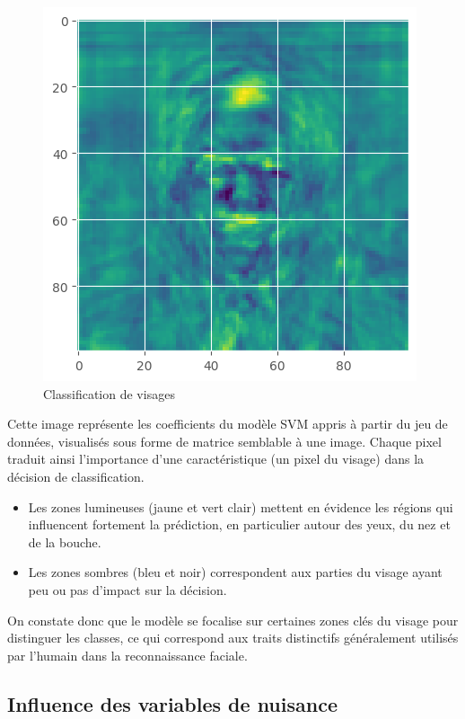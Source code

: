 \documentclass[12pt,a4paper]{report}
\begin{document}
\begin{figure}[H]
    \centering
    \includegraphics[width=0.9\linewidth]{images/predic.png}
    \caption{ Classification de visages}
    \label{fig:placeholder}
\end{figure}
Cette image représente les coefficients du modèle SVM appris à partir du jeu de données, visualisés sous forme de matrice semblable à une image. Chaque pixel traduit ainsi l'importance d'une caractéristique (un pixel du visage) dans la décision de classification.
\begin{itemize}
    \item Les zones lumineuses (jaune et vert clair) mettent en évidence les régions qui influencent fortement la prédiction, en particulier autour des yeux, du nez et de la bouche.
    \item Les zones sombres (bleu et noir) correspondent aux parties du visage ayant peu ou pas d’impact sur la décision.
\end{itemize}
On constate donc que le modèle se focalise sur certaines zones clés du visage pour distinguer les classes, ce qui correspond aux traits distinctifs généralement utilisés par l'humain dans la reconnaissance faciale.

\subsection{Influence des variables de nuisance}
\end{document}
